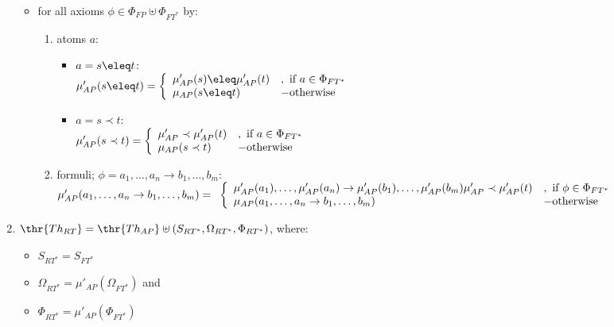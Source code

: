 \begin{definition}
\begin{enumerate}
\begin{itemize}
		\item for all axioms $\phi \in \Phi_{FP} \uplus \Phi_{FT^*}$ by: 		\begin{enumerate}
			\item atoms $a$:
				\begin{itemize}
				\item $a = s \eleq t$:\\
			$\mu'_{AP}(s \eleq t)  = \left\{\begin{array}{ll}
			\mu'_{AP}(s) \eleq \mu'_{AP}(t)	& , \mbox{ if } a \in \Phi_{FT^*}	\\
			\mu_{AP}(s \eleq t)	&  - {\rm otherwise} 
				\end{array}\right.$
				\item $a = s \prec t$:\\
			$\mu'_{AP}(s \prec t)  = \left\{\begin{array}{ll}
			\mu'_{AP} \prec \mu'_{AP}(t)	& , \mbox{ if } a \in \Phi_{FT^*}	\\
			\mu_{AP}(s \prec t)	&  - {\rm otherwise} 
				\end{array}\right.$
				\end{itemize}
			\item formuli; $\phi = a_1, \ldots ,a_n \to b_1, \ldots ,b_m$:\\
			$\mu'_{AP}(a_1, \ldots ,a_n \to b_1, \ldots ,b_m)  = \\
	\ \left\{\begin{array}{ll}
			\mu'_{AP}(a_1), \ldots ,\mu'_{AP}(a_n) \to \mu'_{AP}(b_1), \ldots ,\mu'_{AP}(b_m)\mu'_{AP} \prec \mu'_{AP}(t)	
						& , \mbox{ if } \phi \in \Phi_{FT^*}	\\
			\mu_{AP}(a_1, \ldots ,a_n \to b_1, \ldots ,b_m) 						&  - {\rm otherwise} 
				\end{array}\right.$
			\end{enumerate}
		\end{itemize}
	\item $\thr{Th_{RT}} = \thr{Th_{AP}} \uplus (S_{RT^*}, \Omega_{RT^*}, \Phi_{RT^*})$, where:
		\begin{itemize}
		\item $S_{RT^*} = S_{FT^*}$
		\item $\Omega_{RT^*} = \mu'_{AP}(\Omega_{FT^*})$ and
		\item $\Phi_{RT^*} = \mu'_{AP}(\Phi_{FT^*})$
		\end{itemize}
	\end{enumerate}

\end{definition}


